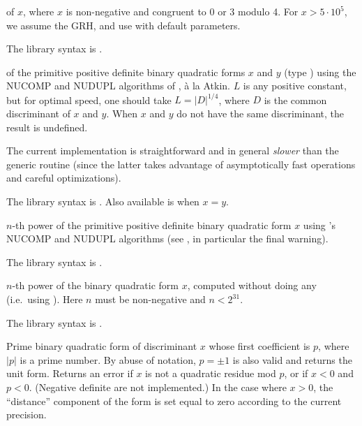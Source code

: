 \label{se:qfbhclassno}
 of $x$, where
$x$ is non-negative and congruent to 0 or 3 modulo 4. For $x > 5\cdot
10^5$, we assume the GRH, and use  with default
parameters.

The library syntax is .

\label{se:qfbnucomp}
 of the primitive positive
definite binary quadratic forms $x$ and $y$ (type ) using the NUCOMP
and NUDUPL algorithms of , \`a la Atkin. $L$ is any positive
constant, but for optimal speed, one should take $L=|D|^{1/4}$, where $D$ is
the common discriminant of $x$ and $y$. When $x$ and $y$ do not have the same
discriminant, the result is undefined.

The current implementation is straightforward and in general \emph{slower}
than the generic routine (since the latter takes advantage of asymptotically
fast operations and careful optimizations).

The library syntax is .
Also available is  when $x=y$.

\label{se:qfbnupow}
$n$-th power of the primitive positive definite
binary quadratic form $x$ using 's NUCOMP and NUDUPL algorithms
(see , in particular the final warning).

The library syntax is .

\label{se:qfbpowraw}
$n$-th power of the binary quadratic form
$x$, computed without doing any  (i.e.~using ).
Here $n$ must be non-negative and $n<2^{31}$.

The library syntax is .

\label{se:qfbprimeform}
Prime binary quadratic form of discriminant
$x$ whose first coefficient is $p$, where $|p|$ is a prime number.
By abuse of notation,
$p = \pm 1$ is also valid and returns the unit form. Returns an
error if $x$ is not a quadratic residue mod $p$, or if $x < 0$ and $p < 0$.
(Negative definite  are not implemented.) In the case where $x>0$,
the ``distance'' component of the form is set equal to zero according to the
current precision.

